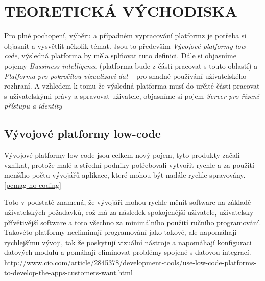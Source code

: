 \chapter{TEORETICKÁ VÝCHODISKA}
\par Pro plné pochopení, výběru a případném vypracování platformz je potřeba si objasnit a vysvětlit několik témat. Jsou to především \textit{Vývojové platformy low-code}, výsledná platforma by měla splňovat tuto definici. Dále si objasníme pojemy \textit{Bussiness intelligence} (platforma bude z části pracovat s touto oblastí) a \textit{Platforma pro pokročilou vizualizaci dat} -- pro snadné používání uživatelského rozhraní. A vzhledem k tomu že výsledná platforma musí do určité části pracovat s uživatelskými právy a spravovat uživatele, objasníme si pojem \textit{Server pro řízení přístupu a identity}

\section{Vývojové platformy low-code}
\par Vývojové platformy low-code jsou celkem nový pojem, tyto produkty začali vznikat, protože malé a střední podniky potřebovali vytvořit rychle a za použití menšího počtu vývojářů aplikace, které mohou být nadále rychle spravovány. \ref{pcmag-no-coding}

\par Toto v podstatě znamená, že vývojáři mohou rychle měnit software na základě uživatelských požadavků, což má za následek spokojenější uživatele, uživatelsky přívětivější software a toto všechno za minimálního použití ručního programování. Takovéto platformy neeliminují programování jako takové, ale napomáhají rychlejšímu vývoji, tak že poskytují vizuální nástroje a napomáhají konfiguraci datových modulů a pomáhají eliminovat problémy spojené s  datovou integrací. - http://www.cio.com/article/2845378/development-tools/use-low-code-platforms-to-develop-the-apps-customers-want.html

